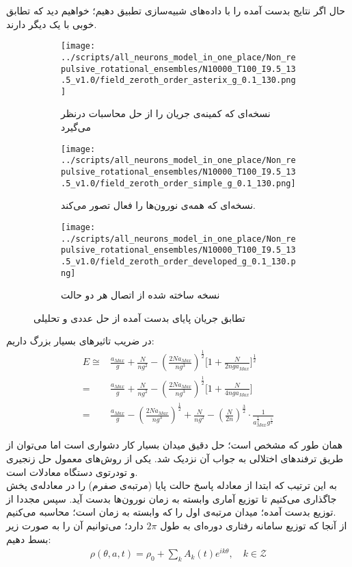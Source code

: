 حال اگر نتایج بدست آمده را با داده‌های شبیه‌سازی تطبیق دهیم؛ خواهیم دید که تطابق خوبی با یک دیگر دارند.

\begin{figure}
	\centering
	\begin{subfigure}[b]{0.7\textwidth}
		\centering
		\texttt{[image: ../scripts/all\_neurons\_model\_in\_one\_place/Non\_repulsive\_rotational\_ensembles/N10000\_T100\_I9.5\_13.5\_v1.0/field\_zeroth\_order\_asterix\_g\_0.1\_130.png]}
		\caption{نسخه‌ای که کمینه‌ی جریان را از حل محاسبات درنظر می‌گیرد}
		\label{fig:e_zeroth_not_all_gifted}
	\end{subfigure}
	\hfill
	\begin{subfigure}[b]{0.7\textwidth}
		\centering
		\texttt{[image: ../scripts/all\_neurons\_model\_in\_one\_place/Non\_repulsive\_rotational\_ensembles/N10000\_T100\_I9.5\_13.5\_v1.0/field\_zeroth\_order\_simple\_g\_0.1\_130.png]}
		\caption{نسخه‌ای که همه‌ی نورون‌ها را فعال تصور می‌کند.}
		\label{fig:e_zeroth_all_gifted}
	\end{subfigure}
	\hfill
	\begin{subfigure}[b]{0.7\textwidth}
		\centering
		\texttt{[image: ../scripts/all\_neurons\_model\_in\_one\_place/Non\_repulsive\_rotational\_ensembles/N10000\_T100\_I9.5\_13.5\_v1.0/field\_zeroth\_order\_developed\_g\_0.1\_130.png]}
		\caption{نسخه ساخته شده از اتصال هر دو حالت}
		\label{fig:e_zeroth_developed}
	\end{subfigure}
	\caption{تطابق جریان پایای بدست آمده از حل عددی و تحلیلی}
	\label{fig:three graphs}
\end{figure}

در ضریب تاثیرهای بسیار بزرگ داریم:
\begin{align}
	E \cong & \frac{a_{Max}}{g} + \frac{N}{ng^2} - (\frac{2N a_{Max}}{n g^3})^{\frac{1}{2}} \big[ 1 + \frac{N}{2nga_{Max}} \big]^{\frac{1}{2}}\\
	=& \frac{a_{Max}}{g} + \frac{N}{ng^2} - (\frac{2 N a_{Max}}{n g^3})^{\frac{1}{2}} \big[ 1 + \frac{N}{4nga_{Max}} \big]\\
	=& \frac{a_{Max}}{g} - (\frac{2 N a_{Max}}{n g^3})^{\frac{1}{2}} + \frac{N}{ng^2}  - (\frac{N}{2n})^{\frac{3}{2}}  \cdot \frac{1}{ {a^{\frac{1}{2}}_{Max} g^{\frac{5}{2}}}}
\end{align}


همان طور که مشخص است؛ حل دقیق میدان بسیار کار دشواری است اما می‌توان از طریق ترفندهای اختلالی به جواب آن نزدیک شد. یکی از روش‌های معمول حل زنجیری و تودرتوی دستگاه معادلات است. \\
به این ترتیب که ابتدا از معادله  پاسخ حالت پایا (مرتبه‌ی صفرم) را در معادله‌ی پخش جاگذاری می‌کنیم تا توزیع آماری وابسته به زمان نورون‌ها بدست آید. سپس مجددا از توزیع بدست آمده؛ میدان مرتبه‌ی اول را که وابسته به زمان است؛ محاسبه می‌کنیم.\\
از آنجا که توزیع سامانه‌ رفتاری دوره‌ای به طول $2\pi$ دارد؛ می‌توانیم آن را به صورت زیر بسط دهیم:
\begin{align}
	\rho(\theta, a, t) = \rho_0 + \sum_k A_k(t) e^{ik\theta}, \quad k \in \mathcal{Z}
\end{align}

